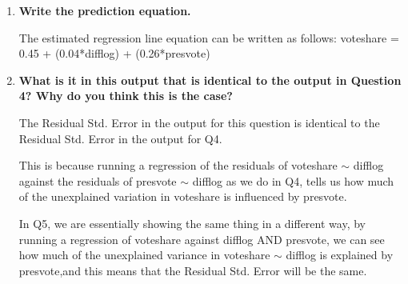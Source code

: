 \documentclass[12pt,letterpaper]{article}
\begin{document}
\begin{enumerate}
		
		\item \textbf{Write the prediction equation.}	\vspace{.25cm}
		
		\noindent The estimated regression line equation can be written as follows: 
		\newline voteshare = 0.45 + (0.04*difflog) + (0.26*presvote)
		
		\item \textbf{What is it in this output that is identical to the output in Question 4? Why do you think this is the case?}
		
		The Residual Std. Error	in the output for this question is identical to the 
		Residual Std. Error	in the output for Q4. 
		
		This is because running a regression of the residuals of voteshare $\sim$ difflog against 
		the residuals of presvote $\sim$ difflog as we do in Q4, tells us how much of the unexplained 
		variation in voteshare is influenced by presvote. 
		
		In Q5, we are essentially showing the same thing in a different way, by running 
		a regression of voteshare against difflog AND presvote, we can see how much of the unexplained 
		variance in voteshare $\sim$ difflog is explained by presvote,and this means that the Residual Std. Error will be the same. 
		
	\end{enumerate}
	
	
	
	
\end{document}
